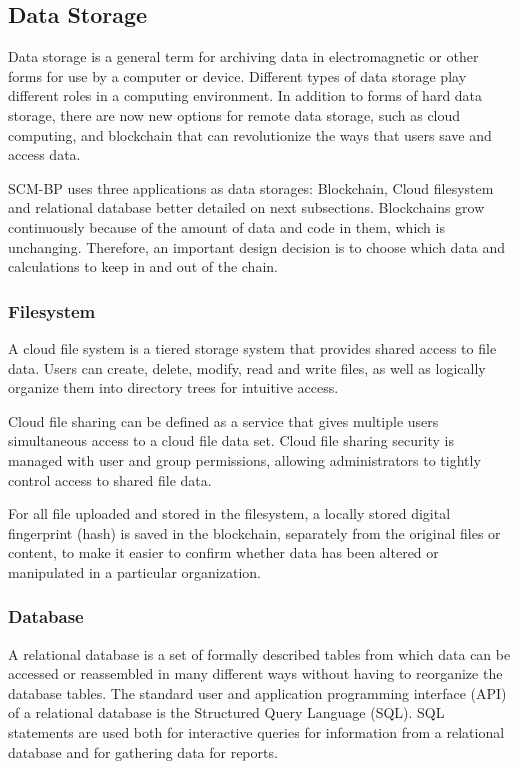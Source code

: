 \subsection{Data Storage}\label{sec:DataStorage}
Data storage is a general term for archiving data in electromagnetic or other forms for use by a computer or device. Different types of data storage play different roles in a computing environment. In addition to forms of hard data storage, there are now new options for remote data storage, such as cloud computing, and blockchain that can revolutionize the ways that users save and access data.  

SCM-BP uses three applications as data storages: Blockchain, Cloud filesystem and relational database better detailed on next subsections. Blockchains grow continuously because of the amount of data and code in them, which is unchanging. Therefore, an important design decision is to choose which data and calculations to keep in and out of the chain.

\subsubsection{Filesystem}\label{sec:Filesystem}
A cloud file system is a tiered storage system that provides shared access to file data. Users can create, delete, modify, read and write files, as well as logically organize them into directory trees for intuitive access.

Cloud file sharing can be defined as a service that gives multiple users simultaneous access to a cloud file data set. Cloud file sharing security is managed with user and group permissions, allowing administrators to tightly control access to shared file data.

For all file uploaded and stored in the filesystem, a locally stored digital fingerprint (hash) is saved in the blockchain, separately from the original files or content, to make it easier to confirm whether data has been altered or manipulated in a particular organization.

\subsubsection{Database}\label{sec:Database}
A relational database is a set of formally described tables from which data can be accessed or reassembled in many different ways without having to reorganize the database tables. The standard user and application programming interface (API) of a relational database is the Structured Query Language (SQL). SQL statements are used both for interactive queries for information from a relational database and for gathering data for reports.
